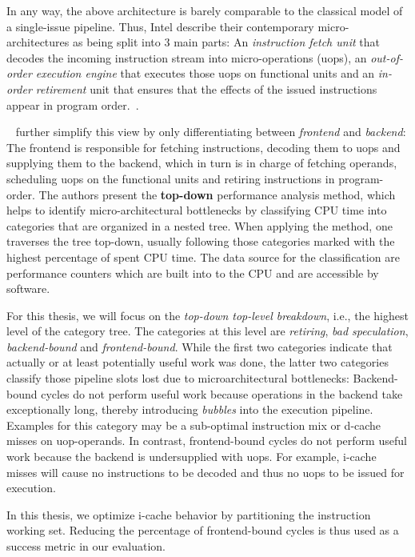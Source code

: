 \documentclass[12pt,a4paper]{book}
\begin{document}
In any way, the above architecture is barely comparable to the classical model of a single-issue pipeline.
Thus, Intel describe their contemporary micro-architectures as being split into 3 main parts:
An \emph{instruction fetch unit} that decodes the incoming instruction stream into micro-operations (uops),
an \emph{out-of-order execution engine} that executes those uops on functional units and
an \emph{in-order retirement} unit that ensures that the effects of the issued instructions appear in program order.~\cite{intelArchPipeline}.

\citeauthor{yasinTopdown}~\cite{yasinTopdown} further simplify this view by only differentiating between \emph{frontend} and \emph{backend}:
The frontend is responsible for fetching instructions, decoding them to uops and supplying them to the backend, which in turn is in charge of fetching operands, scheduling uops on the functional units and retiring instructions in program-order.
The authors present the \textbf{top-down} performance analysis method, which helps to identify micro-architectural bottlenecks by classifying CPU time into categories that are organized in a nested tree.
When applying the method, one traverses the tree top-down, usually following those categories marked with the highest percentage of spent CPU time.
The data source for the classification are performance counters which are built into to the CPU and are accessible by software.

For this thesis, we will focus on the \emph{top-down top-level breakdown}, i.e., the highest level of the category tree.
The categories at this level are \emph{retiring}, \emph{bad speculation}, \emph{backend-bound} and  \emph{frontend-bound}.
While the first two categories indicate that actually or at least potentially useful work was done, the latter two categories classify those pipeline slots lost due to microarchitectural bottlenecks:
Backend-bound cycles do not perform useful work because operations in the backend take exceptionally long, thereby introducing \emph{bubbles} into the execution pipeline.
Examples for this category may be a sub-optimal instruction mix or d-cache misses on uop-operands.
In contrast, frontend-bound cycles do not perform useful work because the backend is undersupplied with uops.
For example, i-cache misses will cause no instructions to be decoded and thus no uops to be issued for execution.~\cite{yasinTopdown,intelVtuneHelpRef,intelArchPipeline}

In this thesis, we optimize i-cache behavior by partitioning the instruction working set.
Reducing the percentage of frontend-bound cycles is thus used as a success metric in our evaluation.
\end{document}
